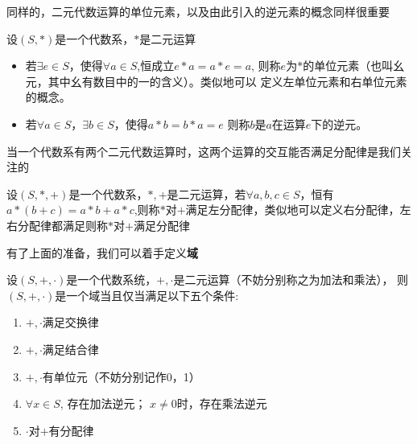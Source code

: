 同样的，二元代数运算的单位元素，以及由此引入的逆元素的概念同样很重要
\begin{definition}
    设$(S,*)$是一个代数系，$*$是二元运算
    \begin{itemize}
        \item 若$\exists e \in S$，使得$\forall a \in S$,恒成立$e*a=a*e=a$,
        则称$e$为$*$的单位元素（也叫幺元，其中幺有数目中的一的含义）。类似地可以
        定义左单位元素和右单位元素的概念。
        \item 若$\forall a \in S，\exists b \in S$，使得$a*b=b*a=e$
        则称$b$是$a$在运算$e$下的逆元。
    \end{itemize}
\end{definition}

当一个代数系有两个二元代数运算时，这两个运算的交互能否满足分配律是我们关注的
\begin{definition}
    设$(S,*,+)$是一个代数系，$*,+$是二元运算，若$\forall a,b,c \in S$，恒有
    $a*(b+c)=a*b+a*c$,则称$*$对$+$满足左分配律，类似地可以定义右分配律，左右分配律都满足则称$*$对$+$满足分配律
\end{definition}

有了上面的准备，我们可以着手定义\textbf{域}
\begin{definition}
    设$(S,+,\cdot)$是一个代数系统，$+,\cdot$是二元运算（不妨分别称之为加法和乘法），
    则$(S,+,\cdot)$是一个域当且仅当满足以下五个条件:
    \begin{enumerate}
        \item $+,\cdot$满足交换律
        \item $+,\cdot$满足结合律
        \item $+,\cdot$有单位元（不妨分别记作0，1）
        \item $\forall x \in S$, 存在加法逆元；
                $x\neq 0$时，存在乘法逆元
        \item $\cdot$对$+$有分配律
    \end{enumerate}
\end{definition}


